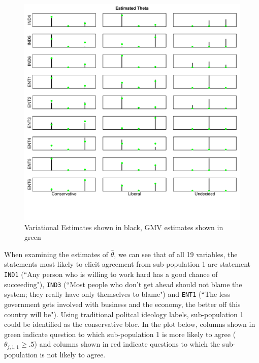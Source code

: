 \documentclass{article}\usepackage[]{graphicx}\usepackage[]{color}
\makeatletter
\def\maxwidth{ %
  \ifdim\Gin@nat@width>\linewidth
    \linewidth
  \else
    \Gin@nat@width
  \fi
}
\newenvironment{knitrout}{}{} %
\renewenvironment{knitrout}{\begin{singlespace}}{\end{singlespace}}
\makeatother
\begin{document}
\begin{knitrout}
\begin{figure}
{\centering \includegraphics[width=\maxwidth]{figure/thetaPlot-2} 

}

\caption[Variational Estimates shown in black, GMV estimates shown in green]{Variational Estimates shown in black, GMV estimates shown in green\label{fig:thetaPlot2}}
\end{figure}


\end{knitrout}

When examining the estimates of $\hat \theta$, we can see that of all 19 variables, the statements most likely to elicit agreement from sub-population 1 are statement \texttt{IND1} (``Any person who is willing to work hard has a good chance of succeeding"), \texttt{IND3} (``Most people who don't get ahead should not blame the system; they really have only themselves to blame") and \texttt{ENT1} (``The less government gets involved with business and the economy, the better off this country will be"). Using traditional politcal ideology labels, sub-population 1 could be identified as the conservative bloc. In the plot below, columns shown in green indicate question to which sub-population 1 is more likely to agree ($\theta_{j,1,1} \geq .5$) and columns shown in red indicate questions to which the sub-population is not likely to agree.
\end{document}
